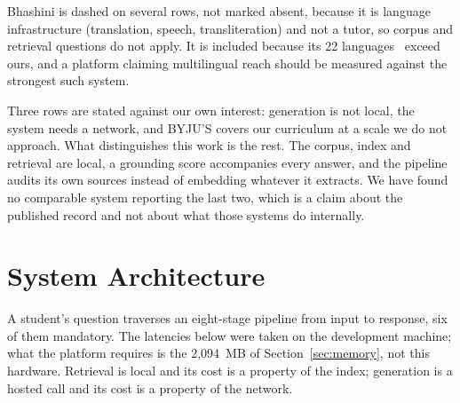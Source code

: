 \ifshort\else  %
Bhashini is dashed on several rows, not marked absent, because it is language infrastructure (translation, speech, transliteration) and not a tutor, so corpus and retrieval questions do not apply. It is included because its 22 languages~\cite{b22} exceed ours, and a platform claiming multilingual reach should be measured against the strongest such system.
\fi

Three rows are stated against our own interest: generation is not local, the system needs a network, and BYJU'S covers our curriculum at a scale we do not approach. What distinguishes this work is the rest. The corpus, index and retrieval are local, a grounding score accompanies every answer, and the pipeline audits its own sources instead of embedding whatever it extracts. We have found no comparable system reporting the last two, which is a claim about the published record and not about what those systems do internally.

\section{System Architecture}

A student's question traverses an eight-stage pipeline from input to response, six of them mandatory. The latencies below were taken on the development machine; what the platform requires is the 2{,}094~MB of Section~\ref{sec:memory}, not this hardware. Retrieval is local and its cost is a property of the index; generation is a hosted call and its cost is a property of the network.

